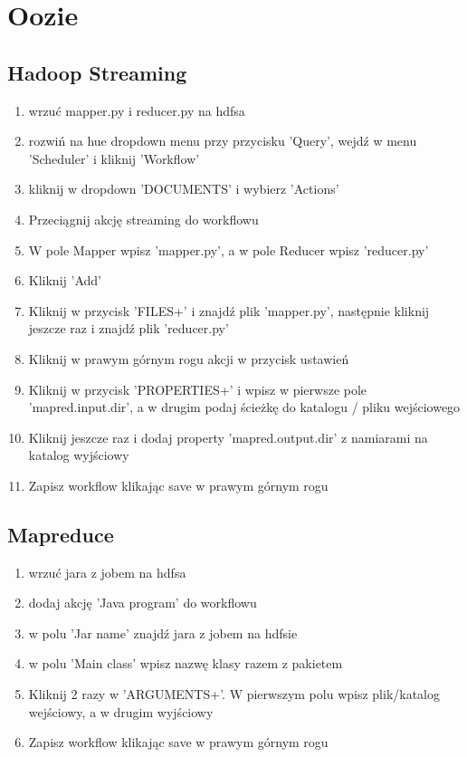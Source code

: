 \documentclass[11pt]{article}
\begin{document}
\section*{Oozie}

\subsection*{Hadoop Streaming}
\begin{enumerate}
\item wrzuć mapper.py i reducer.py na hdfsa
\item rozwiń na hue dropdown menu przy przycisku 'Query', wejdź w menu 'Scheduler' i kliknij  'Workflow'
\item kliknij w dropdown 'DOCUMENTS' i wybierz 'Actions'
\item Przeciągnij akcję streaming do workflowu
\item W pole Mapper wpisz 'mapper.py', a w pole Reducer wpisz 'reducer.py'
\item Kliknij 'Add'
\item Kliknij w przycisk 'FILES+' i znajdź plik 'mapper.py', następnie kliknij jeszcze raz i znajdź plik 'reducer.py'
\item Kliknij w prawym górnym rogu akcji w przycisk ustawień
\item Kliknij w przycisk 'PROPERTIES+' i wpisz w pierwsze pole 'mapred.input.dir', a w drugim podaj ścieżkę do katalogu / pliku wejściowego
\item Kliknij jeszcze raz i dodaj property 'mapred.output.dir' z namiarami na katalog wyjściowy
\item Zapisz workflow klikając save w prawym górnym rogu
\end{enumerate}

\subsection*{Mapreduce}
\begin{enumerate}
\item wrzuć jara z jobem na hdfsa
\item dodaj akcję 'Java program' do workflowu
\item w polu 'Jar name' znajdź jara z jobem na hdfsie
\item w polu 'Main class' wpisz nazwę klasy razem z pakietem
\item Kliknij 2 razy w 'ARGUMENTS+'. W pierwszym polu wpisz plik/katalog wejściowy, a w drugim wyjściowy
\item Zapisz workflow klikając save w prawym górnym rogu
\end{enumerate}
\end{document}
